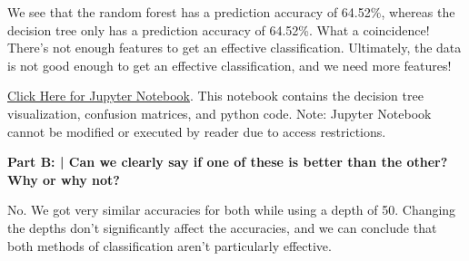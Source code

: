 \documentclass{article}
\begin{document}
 We see that the random forest has a prediction accuracy of 64.52\%, whereas the decision tree only has a prediction accuracy of 64.52\%. What a coincidence! There's not enough features to get an effective classification. Ultimately, the data is not good enough to get an effective classification, and we need more features!
 
 \href{https://colab.research.google.com/drive/10dv-PY23SnotLZtXZajzoBCYQMiqAmx5}{Click Here for Jupyter Notebook}. This notebook contains the decision tree visualization, confusion matrices, and python code. Note: Jupyter Notebook cannot be modified or executed by reader due to access restrictions.
 
 \textbf{Part B: | Can we clearly say if one of these is better than the other? Why or why not?}\newline
 
 No. We got very similar accuracies for both while using a depth of 50. Changing the depths don't significantly affect the accuracies, and we can conclude that both methods of classification aren't particularly effective.
 
 
\end{document}
